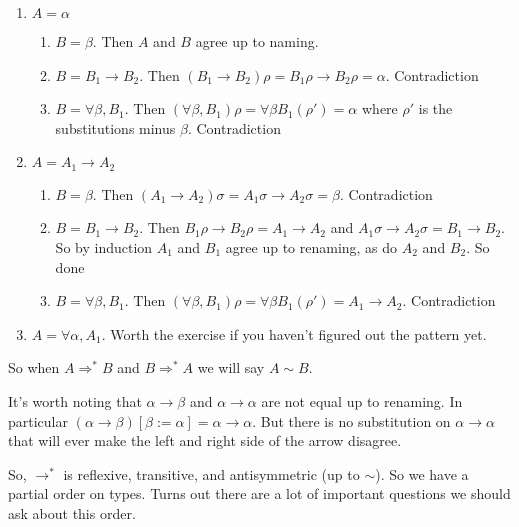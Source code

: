 \documentclass[12pt]{article}
\begin{document}
\begin{enumerate}
    \item $A = \alpha$
        \begin{enumerate}
            \item $B = \beta$. Then $A$ and $B$ agree up to naming.
            \item $B = B_1 \rightarrow B_2$. 
                Then $(B_1 \rightarrow B_2)\rho = B_1\rho \rightarrow B_2\rho = \alpha$. Contradiction
            \item $B = \forall \beta, B_1$. 
                Then $(\forall \beta, B_1)\rho = \forall \beta B_1(\rho') = \alpha$
                where $\rho'$ is the substitutions minus $\beta$. Contradiction
        \end{enumerate}
    \item $A = A_1 \rightarrow A_2$
        \begin{enumerate}
            \item $B = \beta$. Then $(A_1 \rightarrow A_2)\sigma = A_1\sigma \rightarrow A_2\sigma = \beta$. Contradiction
            \item $B = B_1 \rightarrow B_2$. 
                Then $B_1\rho \rightarrow B_2\rho = A_1 \rightarrow A_2$ and $A_1\sigma \rightarrow A_2\sigma = B_1 \rightarrow B_2$. So by induction $A_1$ and $B_1$ agree up to renaming, as do $A_2$ and $B_2$. So done
            \item $B = \forall \beta, B_1$. 
                Then $(\forall \beta, B_1)\rho = \forall \beta B_1(\rho') = A_1 \rightarrow A_2$. Contradiction
        \end{enumerate}
    \item $A = \forall \alpha, A_1$. Worth the exercise if you haven't figured out the pattern yet.
\end{enumerate}
So when $A \Rightarrow^* B$ and $B\Rightarrow^* A$ we will say $A \sim B$.

It's worth noting that $\alpha \rightarrow \beta$ and $\alpha \rightarrow \alpha$ are not equal up to renaming. 
In particular $(\alpha \rightarrow \beta)[\beta := \alpha] = \alpha \rightarrow \alpha$.
But there is no substitution on $\alpha \rightarrow \alpha$ that will ever make the left and right side of the arrow disagree.

So, $\rightarrow^*$ is reflexive, transitive, and antisymmetric (up to $\sim$).
So we have a partial order on types.
Turns out there are a lot of important questions we should ask about this order.
\end{document}

